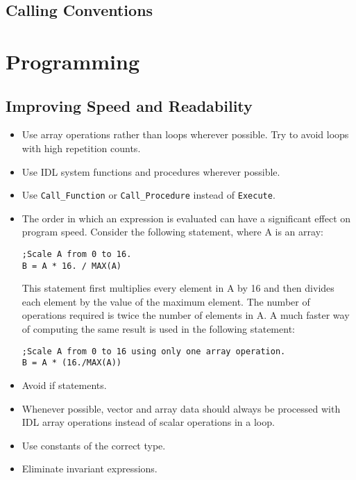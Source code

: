 \documentclass[12pt]{article}
\begin{document}
\subsection{Calling Conventions}

\section{Programming}


\subsection{Improving Speed and Readability}

\begin{itemize}
\item Use array operations rather than loops wherever possible. Try to avoid loops with high repetition counts.
\item Use IDL system functions and procedures wherever possible.
\item Use \texttt{Call\_Function} or \texttt{Call\_Procedure} instead of \texttt{Execute}.
\item The order in which an expression is evaluated can have a significant effect on program speed. Consider the following statement, where A is an array:
\begin{verbatim}
;Scale A from 0 to 16.
B = A * 16. / MAX(A)
\end{verbatim}
This statement first multiplies every element in A by 16 and then divides each element by the value of the maximum element. The number of operations required is twice the number of elements in A. A much faster way of computing the same result is used in the following statement:
\begin{verbatim}
;Scale A from 0 to 16 using only one array operation.
B = A * (16./MAX(A))
\end{verbatim}
\item Avoid if statements.
\item Whenever possible, vector and array data should always be processed with IDL array operations instead of scalar operations in a loop. 
\item Use constants of the correct type.
\item Eliminate invariant expressions.
\end{itemize}
\end{document}
